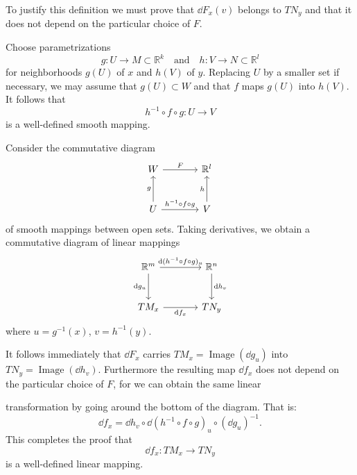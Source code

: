 To justify this definition we must prove that $\dd F_x(v)$ belongs to $TN_y$ and that it does not depend on the particular choice of $F$.

Choose parametrizations
\[
g : U \to M \subset \mathbb{R}^k \quad \text{and} \quad h : V \to N \subset \mathbb{R}^l
\]
for neighborhoods $g(U)$ of $x$ and $h(V)$ of $y$. Replacing $U$ by a smaller set if necessary, we may assume that $g(U) \subset W$ and that $f$ maps $g(U)$ into $h(V)$. It follows that
\[
h^{-1} \circ f \circ g : U \to V
\]
is a well-defined smooth mapping.

Consider the commutative diagram
\[
\begin{tikzcd}[column sep=large, row sep=large]
W \arrow[r, "F"] & \mathbb{R}^l \\
U \arrow[u, "g"] \arrow[r, "{h^{-1} \circ f \circ g}"] & V \arrow[u, "h"]
\end{tikzcd}
\]
of smooth mappings between open sets. Taking derivatives, we obtain a commutative diagram of linear mappings
\[
\begin{tikzcd}[column sep=large, row sep=large]
\mathbb{R}^m \arrow[r, "\dd(h^{-1} \circ f \circ g)_u"] \arrow[d, "\dd g_u"'] & \mathbb{R}^n \arrow[d, "\dd h_v"] \\
TM_x \arrow[r, "\dd f_x"'] & TN_y
\end{tikzcd}
\]
where $u = g^{-1}(x)$, $v = h^{-1}(y)$.

It follows immediately that $\dd F_x$ carries $TM_x = \operatorname{Image}(\dd g_u)$ into $TN_y = \operatorname{Image}(\dd h_v)$. Furthermore the resulting map $\dd f_x$ does not depend on the particular choice of $F$, for we can obtain the same linear



transformation by going around the bottom of the diagram. That is:
\[
\dd f_x = \dd h_v \circ \dd(h^{-1} \circ f \circ g)_u \circ (\dd g_u)^{-1}.
\]
This completes the proof that
\[
\dd f_x : TM_x \to TN_y
\]
is a well-defined linear mapping.

